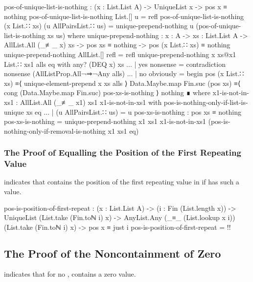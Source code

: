 \documentclass{report}
\begin{document}
\begin{code}
    pos-of-unique-list-is-nothing :
      (x : List.List A) ->
      UniqueList x ->
      pos x ≡ nothing
    pos-of-unique-list-is-nothing List.[] u = refl
    pos-of-unique-list-is-nothing (x List.∷ xs) (u AllPairsList.∷ us) =
      unique-prepend-nothing u (pos-of-unique-list-is-nothing xs us)
      where
      unique-prepend-nothing :
        {x : A} ->
        {xs : List.List A} ->
        AllList.All (_≢_ x) xs ->
        pos xs ≡ nothing ->
        pos (x List.∷ xs) ≡ nothing
      unique-prepend-nothing AllList.[] refl = refl
      unique-prepend-nothing {x} xs@{x1 List.∷ xs1} alls eq with any? (DEQ x) xs
      ... | yes nonsense = contradiction nonsense (AllListProp.All¬⇒¬Any alls)
      ... | no obviously = begin
        pos (x List.∷ xs)
          ≡⟨ unique-element-prepend x xs alls ⟩
        Data.Maybe.map Fin.suc (pos xs)
          ≡⟨ cong (Data.Maybe.map Fin.suc) pos-xs-is-nothing ⟩
        nothing ∎
        where
        x1-is-not-in-xs1 : AllList.All (_≢_ x1) xs1
        x1-is-not-in-xs1 with pos-is-nothing-only-if-list-is-unique xs eq
        ... | (u AllPairsList.∷ us) = u
        pos-xs-is-nothing : pos xs ≡ nothing
        pos-xs-is-nothing =
          unique-prepend-nothing {x1} {xs1}
                                 x1-is-not-in-xs1
                                 (pos-is-nothing-only-if-removal-is-nothing {x1} {xs1} eq)
\end{code}

\subsubsection{The Proof of Equalling the Position of the First Repeating Value}
 indicates that   contains the position of the first repeating value in  if  has such a value.

\begin{code}
    pos-is-position-of-first-repeat :
      (x : List.List A) ->
      (i : Fin (List.length x)) ->
      UniqueList (List.take (Fin.toℕ i) x) ->
      AnyList.Any (_≡_ (List.lookup x i)) (List.take (Fin.toℕ i) x) ->
      pos x ≡ just i
    pos-is-position-of-first-repeat = {!!}
\end{code}

\subsection{The Proof of the Noncontainment of Zero}
 indicates that for no ,   contains a zero value.
\end{document}
